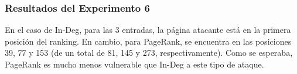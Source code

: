 \FloatBarrier
\begin{figure}[ht]
\qquad
{}
\end{figure}

\begin{figure}[ht]
\end{figure}

\FloatBarrier

\subsubsection{Resultados del Experimento 6}
\par En el caso de In-Deg, para las 3 entradas, la p\'agina atacante est\'a en la primera posici\'on del ranking.
En cambio, para PageRank, se encuentra en las posiciones 39, 77 y 153 (de un total de 81, 145 y 273, respectivamente).
Como se esperaba, PageRank es mucho menos vulnerable que In-Deg a este tipo de ataque.

